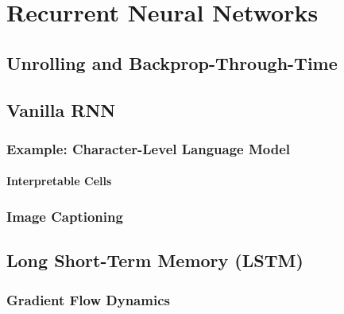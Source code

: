 \chapter{Recurrent Neural Networks} %

	\section{Unrolling and Backprop-Through-Time} %

	\section{Vanilla RNN} %

		\subsection{Example: Character-Level Language Model} %

			\subsubsection{Interpretable Cells} %

		\subsection{Image Captioning} %

	\section{Long Short-Term Memory (LSTM)} %

		\subsection{Gradient Flow Dynamics} %

